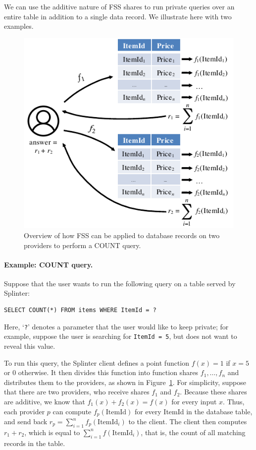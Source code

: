 We can use the additive nature of FSS shares to run private queries over
an entire table in addition to a single data record.
We illustrate here with two examples.

\begin{figure}
	\centering
	\includegraphics[width=\textwidth]{splinter-figs/fss.pdf}
	\caption{Overview of how FSS can be applied to database records
		on two providers to perform a COUNT query.}
	\label{fig:fss_overview}
\end{figure}


\paragraph{Example: COUNT query.}
Suppose that the user wants to run the following query on
a table served by Splinter:
\begin{verbatim}
SELECT COUNT(*) FROM items WHERE ItemId = ?
\end{verbatim}

Here, `\texttt{?}' denotes a parameter that the user would like to keep
private; for example, suppose the user is searching for \texttt{ItemId = 5},
but does not want to reveal this value.

To run this query, the Splinter client defines a point function $f(x)=1$ if $x=5$
or 0 otherwise.
It then divides this function into function shares $f_1,\dots,f_n$ and
distributes them to the providers, as shown in Figure~\ref{fig:fss_overview}.
For simplicity, suppose that there are two providers, who receive shares
$f_1$ and $f_2$.
Because these shares are additive, we know that $f_1(x)+f_2(x)=f(x)$
for every input $x$.
Thus, each provider $p$ can compute $f_p(\mathrm{ItemId})$ for every ItemId in the
database table, and send back $r_p = \sum_{i=1}^n f_p(\mathrm{ItemId}_i)$
to the client.
The client then computes $r_1 + r_2$, which is equal
to $\sum_{i=1}^n f(\mathrm{ItemId}_i)$, that is, the count of all matching
records in the table.


